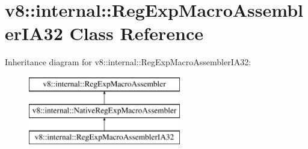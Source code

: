 \hypertarget{classv8_1_1internal_1_1_reg_exp_macro_assembler_i_a32}{}\section{v8\+:\+:internal\+:\+:Reg\+Exp\+Macro\+Assembler\+I\+A32 Class Reference}
\label{classv8_1_1internal_1_1_reg_exp_macro_assembler_i_a32}
Inheritance diagram for v8\+:\+:internal\+:\+:Reg\+Exp\+Macro\+Assembler\+I\+A32\+:\begin{figure}[H]
\begin{center}
\leavevmode
\includegraphics[height=3.000000cm]{classv8_1_1internal_1_1_reg_exp_macro_assembler_i_a32}
\end{center}
\end{figure}
